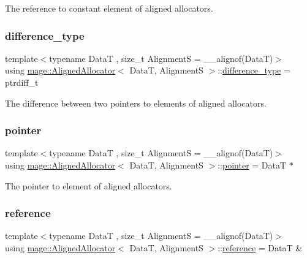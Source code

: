The reference to constant element of aligned allocators. \hypertarget{structmage_1_1_aligned_allocator_aa66abd74c38e5e565fca600a066a5915}{}\label{structmage_1_1_aligned_allocator_aa66abd74c38e5e565fca600a066a5915} 
\subsubsection{\texorpdfstring{difference\+\_\+type}{difference\_type}}
{\footnotesize\ttfamily template$<$typename DataT , size\+\_\+t AlignmentS = \+\_\+\+\_\+alignof(\+Data\+T)$>$ \\
using \hyperlink{structmage_1_1_aligned_allocator}{mage\+::\+Aligned\+Allocator}$<$ DataT, AlignmentS $>$\+::\hyperlink{structmage_1_1_aligned_allocator_aa66abd74c38e5e565fca600a066a5915}{difference\+\_\+type} =  ptrdiff\+\_\+t}

The difference between two pointers to elements of aligned allocators. \hypertarget{structmage_1_1_aligned_allocator_a4f6b515d4d9d27a8b9e27376302034c4}{}\label{structmage_1_1_aligned_allocator_a4f6b515d4d9d27a8b9e27376302034c4} 
\subsubsection{\texorpdfstring{pointer}{pointer}}
{\footnotesize\ttfamily template$<$typename DataT , size\+\_\+t AlignmentS = \+\_\+\+\_\+alignof(\+Data\+T)$>$ \\
using \hyperlink{structmage_1_1_aligned_allocator}{mage\+::\+Aligned\+Allocator}$<$ DataT, AlignmentS $>$\+::\hyperlink{structmage_1_1_aligned_allocator_a4f6b515d4d9d27a8b9e27376302034c4}{pointer} =  DataT $\ast$}

The pointer to element of aligned allocators. \hypertarget{structmage_1_1_aligned_allocator_a95fd7625632a0143d72ad02ca520be4d}{}\label{structmage_1_1_aligned_allocator_a95fd7625632a0143d72ad02ca520be4d} 
\subsubsection{\texorpdfstring{reference}{reference}}
{\footnotesize\ttfamily template$<$typename DataT , size\+\_\+t AlignmentS = \+\_\+\+\_\+alignof(\+Data\+T)$>$ \\
using \hyperlink{structmage_1_1_aligned_allocator}{mage\+::\+Aligned\+Allocator}$<$ DataT, AlignmentS $>$\+::\hyperlink{structmage_1_1_aligned_allocator_a95fd7625632a0143d72ad02ca520be4d}{reference} =  DataT \&}

